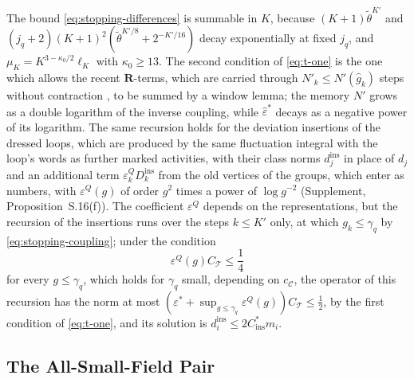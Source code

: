 \documentclass[11pt]{preprint}
\numberwithin{equation}{section}
\theoremstyle{definition}
\theoremstyle{remark}
\theoremstyle{plain}
\begin{document}
The bound \eqref{eq:stopping-differences} is summable in $K$, because $(K + 1)\tilde\theta^{K'}$ and $(j_q + 2)(K + 1)^2(\tilde\theta^{K'/8} + 2^{-K'/16})$ decay exponentially at fixed $j_q$, and $\mu_K = K^{3-\kappa_0/2}\ell_K$ with $\kappa_0 \geq 13$. The second condition of \eqref{eq:t-one} is the one which allows the recent $\mathbf R$-terms, which are carried through $N'_k \leq N'(\hat g_k)$ steps without contraction \cite[pp.~270--271]{BalabanCRE}, to be summed by a window lemma; the memory $N'$ grows as a double logarithm of the inverse coupling, while $\hat\varepsilon^*$ decays as a negative power of its logarithm. The same recursion holds for the deviation insertions of the dressed loops, which are produced by the same fluctuation integral with the loop's words as further marked activities, with their class norms $d^{\mathrm{ins}}_j$ in place of $d_j$ and an additional term $\varepsilon^Q_kD^{\mathrm{ins}}_k$ from the old vertices of the groups, which enter as numbers, with $\varepsilon^Q(g)$ of order $g^2$ times a power of $\log g^{-2}$ (Supplement, Proposition~S.16(f)). The coefficient $\varepsilon^Q$ depends on the representations, but the recursion of the insertions runs over the steps $k \leq K'$ only, at which $g_k \leq \gamma_q$ by \eqref{eq:stopping-coupling}; under the condition
\begin{equation}\label{eq:insertion-recursion-condition}
    \varepsilon^Q(g)C_{\mathcal T} \leq \frac14
\end{equation}
for every $g \leq \gamma_q$, which holds for $\gamma_q$ small, depending on $c_{\mathcal C}$, the operator of this recursion has the norm at most $(\varepsilon^* + \sup_{g \leq \gamma_q}\varepsilon^Q(g))C_{\mathcal T} \leq \frac12$, by the first condition of \eqref{eq:t-one}, and its solution is $d^{\mathrm{ins}}_i \leq 2C^*_{\mathrm{ins}}m_i$.

\subsection{The All-Small-Field Pair}\label{sec:trivial-pair}
\end{document}
